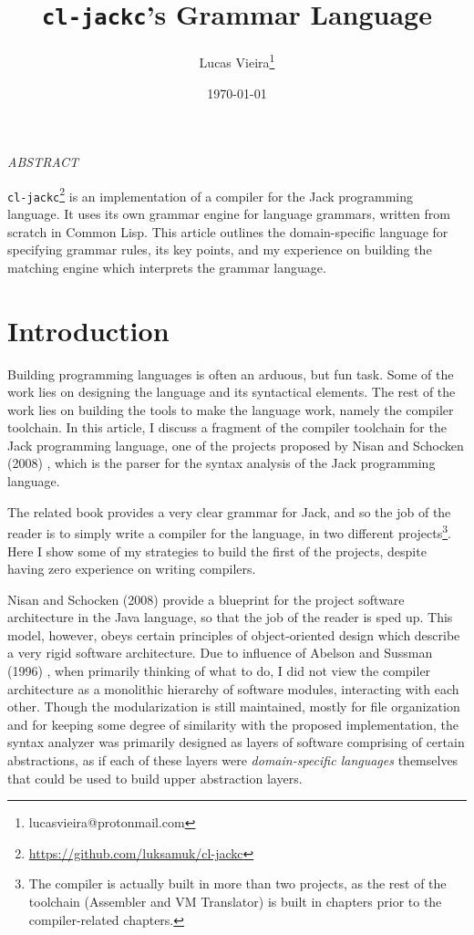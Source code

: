 \documentclass[a4paper,11pt,oneside]{article}
\author{Lucas Vieira\thanks{lucasvieira@protonmail.com}}
\date{\today}
\title{\texttt{cl-jackc}'s Grammar Language}
\begin{document}
\maketitle
\begin{center}
\emph{ABSTRACT}
\end{center}

\par\noindent
\texttt{cl-jackc}\footnote{\url{https://github.com/luksamuk/cl-jackc}} is an implementation of a compiler for the Jack
programming language. It uses its own grammar engine for language
grammars, written from scratch in Common Lisp. This article outlines
the domain-specific language for specifying grammar rules, its key
points, and my experience on building the matching engine which
interprets the grammar language.


\section{Introduction}
\label{sec:org23607fe}

Building programming languages is often an arduous, but fun task. Some
of the work lies on designing the language and its syntactical
elements. The rest of the work lies on building the tools
to make the language work, namely the compiler toolchain. In this
article, I discuss a fragment of the compiler toolchain for the Jack
programming language, one of the projects proposed by Nisan and
Schocken (2008) \cite{nand2tetris}, which is the parser for the syntax
analysis of the Jack programming language.

The related book provides a very clear grammar for Jack, and so the
job of the reader is to simply write a compiler for the language, in
two different projects\footnote{The compiler is actually built in more than two projects, as
the rest of the toolchain (Assembler and VM Translator) is built in
chapters prior to the compiler-related chapters.}. Here I show some of my strategies to
build the first of the projects, despite having zero experience on
writing compilers.

Nisan and Schocken (2008) \cite{nand2tetris} provide a blueprint for the
project software architecture in the Java language, so that the job of
the reader is sped up. This model, however, obeys certain principles
of object-oriented design which describe a very rigid software
architecture. Due to influence of Abelson and Sussman (1996)
\cite{sicp}, when primarily thinking of what to do, I did not view the
compiler architecture as a monolithic hierarchy of software modules,
interacting with each other. Though the modularization is still
maintained, mostly for file organization and for keeping some degree
of similarity with the proposed implementation, the syntax analyzer
was primarily designed as layers of software comprising of certain
abstractions, as if each of these layers were \emph{domain-specific
languages} themselves that could be used to build upper abstraction
layers.
\end{document}
